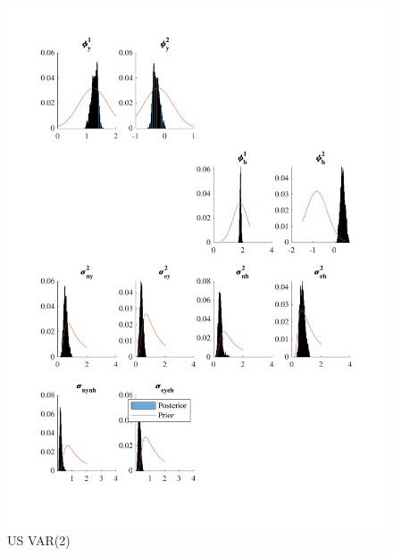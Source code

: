 \documentclass[
  12pt,
]{article}
\begin{document}
\begin{figure}

{\centering \includegraphics[width=0.85\linewidth]{../../Regression/Bayesian_UC_VAR2_nodrift/OutputData/posteriorpriordistribution_US} 

}

\caption{US VAR(2)}\label{fig:unnamed-chunk-12}
\end{figure}
\end{document}
